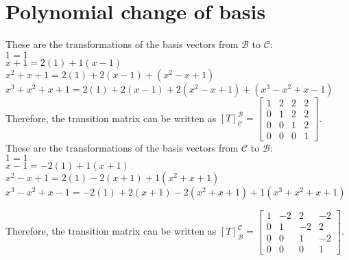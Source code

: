 \section{Polynomial change of basis}

These are the transformations of the basis vectors
from  $\mathcal{B}$ to $\mathcal{C}$:\\ 
$1 = 1$\\
$x+1 = 2(1) + 1(x-1)$\\
$x^2+x+1 = 2(1) + 2(x-1) + (x^2-x+1)$\\
$x^3+x^2+x+1 = 2(1) + 2(x-1) + 2(x^2-x+1) + (x^3-x^2+x-1)$ \gap \\
Therefore, the transition matrix can be written as 
$[T]_\mathcal{C}^\mathcal{B} =
\begin{bmatrix} 
    1 & 2 & 2 & 2 \\
    0 & 1 & 2 & 2 \\
    0 & 0 & 1 & 2 \\
    0 & 0 & 0 & 1
\end{bmatrix}$. \gap \\
These are the transformations of the basis vectors
from $\mathcal{C}$ to $\mathcal{B}$:\\
$1 = 1$\\
$x-1 = -2(1) + 1(x+1)$\\
$x^2-x+1 = 2(1) - 2(x+1) + 1(x^2+x+1)$\\
$x^3-x^2+x-1 = -2(1) + 2(x+1) - 2(x^2+x+1) + 1(x^3+x^2+x+1)$

Therefore, the transition matrix can be written as 
$[T]_\mathcal{B}^\mathcal{C} =
\begin{bmatrix} 
    1 & -2 & 2 & -2 \\
    0 & 1 & -2 & 2 \\
    0 & 0 & 1 & -2 \\
    0 & 0 & 0 & 1
\end{bmatrix}$.

